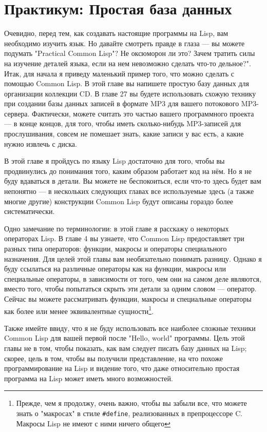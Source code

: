 \chapter{Практикум: Простая база данных}
\label{ch:03}

Очевидно, перед тем, как создавать настоящие программы на Lisp, вам необходимо изучить
язык. Но давайте смотреть правде в глаза --- вы можете подумать "Practical Common Lisp"?
Не оксюморон ли это? Зачем тратить силы на изучение деталей языка, если на нем невозможно
сделать что-то дельное?". Итак, для начала я приведу маленький пример того, что можно
сделать с помощью Common Lisp. В этой главе вы напишете простую базу данных для
организации коллекции CD. В главе 27 вы будете использовать схожую технику при создании
базы данных записей в формате MP3 для вашего потокового MP3-сервера. Фактически, можете
считать это частью вашего программного проекта --- в конце концов, для того, чтобы иметь
сколько-нибудь MP3-записей для прослушивания, совсем не помешает знать, какие записи у вас
есть, а какие нужно извлечь с диска.
 

В этой главе я пройдусь по языку Lisp достаточно для того, чтобы вы продвинулись до
понимания того, каким образом работает код на нём. Но я не буду вдаваться в детали. Вы
можете не беспокоиться, если что-то здесь будет вам непонятно --- в нескольких следующих
главах все используемые здесь (а также многие другие) конструкции Common Lisp будут
описаны гораздо более систематически.

Одно замечание по терминологии: в этой главе я расскажу о некоторых операторах Lisp. В
главе 4 вы узнаете, что Common Lisp предоставляет три разных типа операторов: функции,
макросы и операторы специального назначения. Для целей этой главы вам необязательно
понимать разницу. Однако я буду ссылаться на различные операторы как на функции, макросы
или специальные операторы, в зависимости от того, чем они на самом деле являются, вместо
того, чтобы попытаться скрыть эти детали за одним словом --- оператор. Сейчас вы можете
рассматривать функции, макросы и специальные операторы как более или менее эквивалентные
сущности\footnote{Прежде, чем я продолжу, очень важно, чтобы вы забыли все, что можете
  знать о "макросах" в стиле \lstinline!#define!, реализованных в препроцессоре C. Макросы
  Lisp не имеют с ними ничего общего}.

Также имейте ввиду, что я не буду использовать все наиболее сложные техники Common Lisp
для вашей первой после "Hello, world" программы. Цель этой главы не в том, чтобы показать,
как вам следует писать базу данных на Lisp; скорее, цель в том, чтобы вы получили
представление, на что похоже программирование на Lisp и видение того, что даже
относительно простая программа на Lisp может иметь много возможностей.

